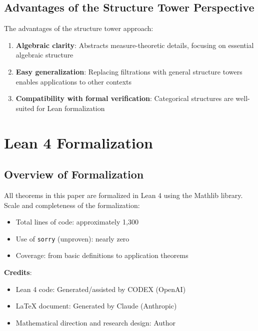 \documentclass[11pt,a4paper]{article}
\theoremstyle{plain}
\theoremstyle{definition}
\begin{document}
\subsection{Advantages of the Structure Tower Perspective}

The advantages of the structure tower approach:
\begin{enumerate}[label=(\arabic*)]
  \item \textbf{Algebraic clarity}: Abstracts measure-theoretic details, 
        focusing on essential algebraic structure
  \item \textbf{Easy generalization}: Replacing filtrations with general 
        structure towers enables applications to other contexts
  \item \textbf{Compatibility with formal verification}: Categorical structures 
        are well-suited for Lean formalization
\end{enumerate}

\section{Lean 4 Formalization}
\label{sec:lean}

\subsection{Overview of Formalization}

All theorems in this paper are formalized in Lean 4 using the Mathlib library.
Scale and completeness of the formalization:
\begin{itemize}
  \item Total lines of code: approximately 1,300
  \item Use of \texttt{sorry} (unproven): nearly zero
  \item Coverage: from basic definitions to application theorems
\end{itemize}

\textbf{Credits}:
\begin{itemize}
  \item Lean 4 code: Generated/assisted by CODEX (OpenAI)
  \item \LaTeX{} document: Generated by Claude (Anthropic)
  \item Mathematical direction and research design: Author
\end{itemize}
\end{document}
